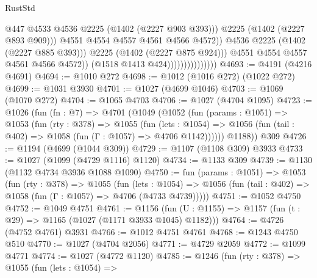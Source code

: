\begin{lexlean}{RustStd}
\begin{coremodule}
                                                @447
                                                @4533
                                                @4536
                                                @2225
                                                (@1402 (@2227 @903 @393)))
                                              @2225
                                              (@1402 (@2227 @893 @909)))
                                            @4551
                                            @4554
                                            @4557
                                            @4561
                                            @4566
                                            @4572))
                                        @4536
                                        @2225
                                        (@1402 (@2227 @885 @393)))
                                      @2225
                                      (@1402 (@2227 @875 @924)))
                                    @4551
                                    @4554
                                    @4557
                                    @4561
                                    @4566
                                    @4572))
                                (@1518 @1413 @424)))))))))))))))
@4693 := @4191 (@4216 @4691)
@4694 := @1010 @272
@4698 := @1012 (@1016 @272) (@1022 @272)
@4699 := @1031 @3930
@4701 := @1027 (@4699 @1046)
@4703 := @1069 (@1070 @272)
@4704 := @1065 @4703
@4706 := @1027 (@4704 @1095)
@4723 := @1026
    (fun (fn : @7) =>
    @4701
      (@1049
        (@1052
          (fun (params : @1051) =>
          @1053
            (fun (rty : @378) =>
            @1055
              (fun (lets : @1054) =>
              @1056 (fun (tail : @402) => @1058 (fun (Γ : @1057) => @4706 @1142))))))
        @1188))
    @309
@4726 := @1194 (@4699 (@1044 @309))
@4729 := @1107 (@1108 @309) @3933
@4733 := @1027 (@1099 (@4729 @1116) @1120)
@4734 := @1133 @309
@4739 := @1130 (@1132 @4734 @3936 @1088 @1090)
@4750 := fun (params : @1051) =>
  @1053
    (fun (rty : @378) =>
    @1055
      (fun (lets : @1054) =>
      @1056 (fun (tail : @402) => @1058 (fun (Γ : @1057) => @4706 (@4733 @4739)))))
@4751 := @1052 @4750
@4752 := @1049 @4751
@4761 := @1156 (fun (U : @1155) => @1157 (fun (t : @29) => @1165 (@1027 (@1171 @3933 @1045) @1182)))
@4764 := @4726 (@4752 @4761) @3931
@4766 := @1012 @4751 @4761
@4768 := @1243 @4750 @510
@4770 := @1027 (@4704 @2056)
@4771 := @4729 @2059
@4772 := @1099 @4771
@4774 := @1027 (@4772 @1120)
@4785 := @1246
    (fun (rty : @378) =>
    @1055
      (fun (lets : @1054) =>

\end{coremodule}
\end{lexlean}
